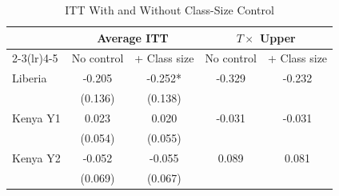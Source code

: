 \begin{table}[htbp]
\centering\small
\caption{ITT With and Without Class-Size Control}
\label{tab:itt_classsize}
\begin{tabular}{lcccc}
\toprule
 & \multicolumn{2}{c}{Average ITT} & \multicolumn{2}{c}{$T \times$ Upper} \\
\cmidrule(lr){2-3}\cmidrule(lr){4-5}
 & No control & + Class size & No control & + Class size \\
\midrule
Liberia & -0.205 & -0.252* & -0.329 & -0.232 \\
 & (0.136) & (0.138) & & \\
Kenya Y1 & 0.023 & 0.020 & -0.031 & -0.031 \\
 & (0.054) & (0.055) & & \\
Kenya Y2 & -0.052 & -0.055 & 0.089 & 0.081 \\
 & (0.069) & (0.067) & & \\
\bottomrule
\end{tabular}
\par\smallskip{}
\end{table}